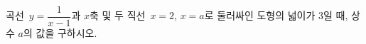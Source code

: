 \hspace*{2mm}\begin{minipage}[t]{\dimexpr\linewidth-2mm\relax}\vspace{0pt}
곡선~$y=\dfrac{1}{x-1}$과 $x$축 및 두 직선~$x=2$, $x=a$로 둘러싸인 도형의 넓이가 $3$일 때, 상수 $a$의 값을 구하시오. \end{minipage}
